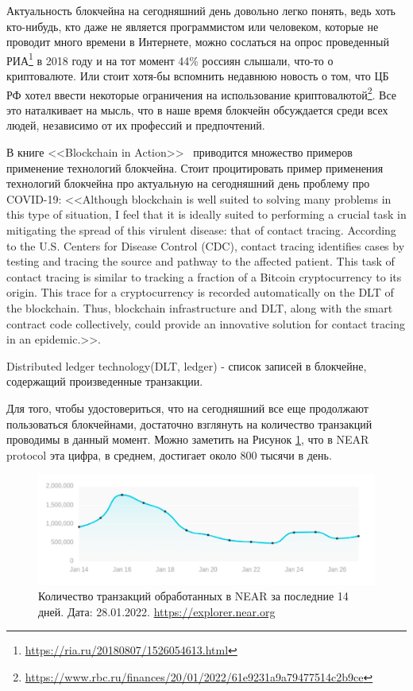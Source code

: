 
Актуальность блокчейна на сегодняшний день довольно легко понять, ведь хоть кто-нибудь, кто даже не является программистом или человеком, которые не проводит много времени в Интернете, можно сослаться на опрос проведенный РИА\footnote{\url{https://ria.ru/20180807/1526054613.html}} в 2018 году и на тот момент 44\% россиян слышали, что-то о криптовалюте. Или стоит хотя-бы вспомнить недавнюю новость о том, что ЦБ РФ хотел ввести некоторые ограничения на использование криптовалютой\footnote{\url{https://www.rbc.ru/finances/20/01/2022/61e9231a9a79477514c2b9ce}}. Все это наталкивает на мысль, что в наше время блокчейн обсуждается среди всех людей, независимо от их профессий и предпочтений.

В книге <<Blockchain in Action>>~\cite*{ramamurthy2020blockchain} приводится множество примеров применение технологий блокчейна. Стоит процитировать пример применения технологий блокчейна про актуальную на сегодняшний день проблему про COVID-19: <<Although blockchain is well suited to solving many problems in this type of situation, I feel that it is ideally suited to performing a crucial task in mitigating the spread of this virulent disease: that of contact tracing. According to the U.S. Centers for Disease Control (CDC), contact tracing identifies cases by testing and tracing the source
and pathway to the affected patient. This task of contact tracing is similar to tracking a fraction of a Bitcoin cryptocurrency to its origin. This trace for a cryptocurrency is
recorded automatically on the DLT of the blockchain. Thus, blockchain infrastructure and DLT, along with the smart contract code collectively, could provide an innovative solution for contact tracing in an epidemic.>>.
\begin{definition}
    Distributed ledger technology(DLT, ledger) - список записей в блокчейне, содержащий произведенные транзакции.~\cite*{ramamurthy2020blockchain, solanadoc}
\end{definition}

Для того, чтобы удостовериться, что на сегодняшний все еще продолжают пользоваться блокчейнами, достаточно взглянуть на количество транзакций проводимы в данный момент. Можно заметить на Рисунок \ref{fig:count_of_tr}, что в NEAR protocol эта цифра, в среднем, достигает около 800 тысячи в день.

\begin{figure}[h!]
    \centering
    \includegraphics[scale=0.5]{fig/count_of_tr.png}
    \caption{Количество транзакций обработанных в NEAR за последние 14 дней. Дата: 28.01.2022. \url{https://explorer.near.org}} \label{fig:count_of_tr}
\end{figure}


